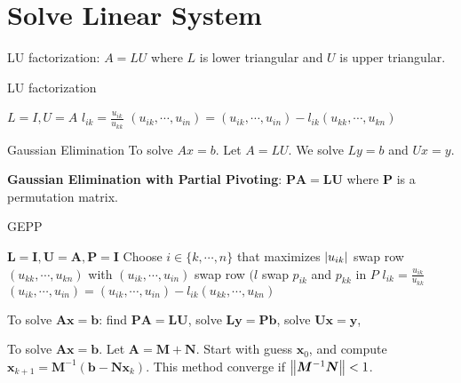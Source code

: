 \documentclass[12pt]{article}
\begin{document}
\section{Solve Linear System}

\begin{theorem}[LU]
	LU factorization: $A = LU$ where $L$ is lower triangular and $U$ is upper triangular.
	\begin{algorithm}[H]
		\caption{LU factorization}
		\begin{algorithmic}[1]
			\State $L = I, U = A$
					\State $l_{ik} = \frac{u_{ik}}{u_{kk}}$
					\State $(u_{ik}, \cdots , u_{in}) = (u_{ik}, \cdots , u_{in}) - l_{ik} (u_{kk}, \cdots , u_{kn})$
				\EndFor
			\EndFor
		\end{algorithmic}
	\end{algorithm}
\end{theorem}

\begin{theorem}{Gaussian Elimination}
	To solve $Ax = b$. Let $A = LU$. We solve $Ly = b$ and $Ux = y$.
\end{theorem}

\begin{theorem}[GEPP]
	\textbf{Gaussian Elimination with Partial Pivoting}: $\bm{PA} = \bm{LU}$ where $\bm{P}$ is a permutation matrix.
	\begin{algorithm}[H]
		\caption{GEPP}
		\begin{algorithmic}[1]
			\State $\bm{L} = \bm{I}, \bm{U} = \bm{A},\bm{P} =\bm{I}$
			\State Choose $i \in \{k, \cdots, n\}$ that maximizes $\left|u_{ik}\right|$
			\State swap row $(u_{kk}, \cdots ,u_{kn})$ with $(u_{ik}, \cdots ,u_{in})$ 
			\State swap row $(l$
			\State swap $p_{ik}$ and $p_{kk}$ in $P$
			\State $l_{ik} = \frac{u_{ik}}{u_{kk}}$
			\State $(u_{ik}, \cdots , u_{in}) = (u_{ik}, \cdots , u_{in}) - l_{ik} (u_{kk}, \cdots , u_{kn})$
			\EndFor
			\EndFor
		\end{algorithmic}
	\end{algorithm}

	To solve $\bm{Ax} = \bm{b}$: find $\bm{PA} = \bm{LU}$, solve $\bm{Ly} = \bm{Pb}$, solve $\bm{Ux} = \bm{y}$,
\end{theorem}

\begin{theorem}
	To solve $\bm{Ax} = \bm{b}$. Let $\bm{A} = \bm{M} + \bm{N}$. Start with guess $\bm{x}_0$, and compute $\bm{x}_{k+1} = \bm{M}^{-1}(\bm{b} - \bm{Nx}_k)$. This method converge if $\left\lVert\bm{M}^{-1}\bm{N}\right\rVert < 1$.
\end{theorem}
\end{document}
